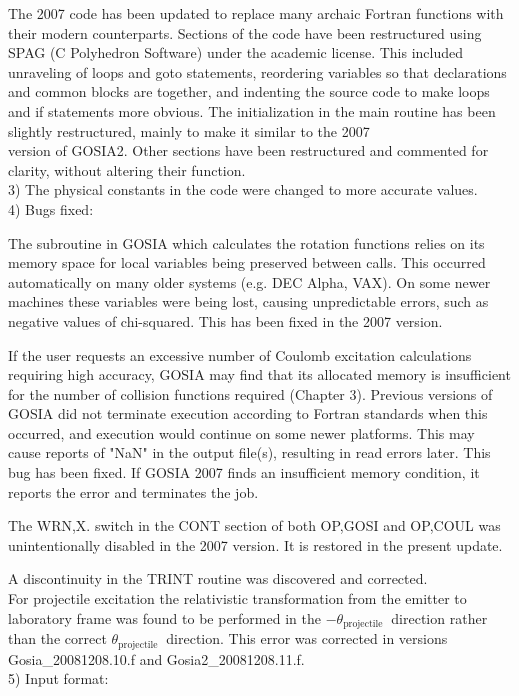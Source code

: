 \documentclass[10pt]{article}
\begin{document}
The 2007 code has been updated to replace many archaic Fortran functions with their modern counterparts. Sections of the code have been restructured using SPAG (C Polyhedron Software) under the academic license. This included unraveling of loops and goto statements, reordering variables so that declarations and common blocks are together, and indenting the source code to make loops and if statements more obvious. The initialization in the main routine has been slightly restructured, mainly to make it similar to the 2007\\
version of GOSIA2. Other sections have been restructured and commented for clarity, without altering their function.\\
3) The physical constants in the code were changed to more accurate values.\\
4) Bugs fixed:

The subroutine in GOSIA which calculates the rotation functions relies on its memory space for local variables being preserved between calls. This occurred automatically on many older systems (e.g. DEC Alpha, VAX). On some newer machines these variables were being lost, causing unpredictable errors, such as negative values of chi-squared. This has been fixed in the 2007 version.

If the user requests an excessive number of Coulomb excitation calculations requiring high accuracy, GOSIA may find that its allocated memory is insufficient for the number of collision functions required (Chapter 3). Previous versions of GOSIA did not terminate execution according to Fortran standards when this occurred, and execution would continue on some newer platforms. This may cause reports of "NaN" in the output file(s), resulting in read errors later. This bug has been fixed. If GOSIA 2007 finds an insufficient memory condition, it reports the error and terminates the job.

The WRN,X. switch in the CONT section of both OP,GOSI and OP,COUL was unintentionally disabled in the 2007 version. It is restored in the present update.

A discontinuity in the TRINT routine was discovered and corrected.\\
For projectile excitation the relativistic transformation from the emitter to laboratory frame was found to be performed in the $-\theta_{\text {projectile }}$ direction rather than the correct $\theta_{\text {projectile }}$ direction. This error was corrected in versions Gosia\_20081208.10.f and Gosia2\_20081208.11.f.\\
5) Input format:
\end{document}
